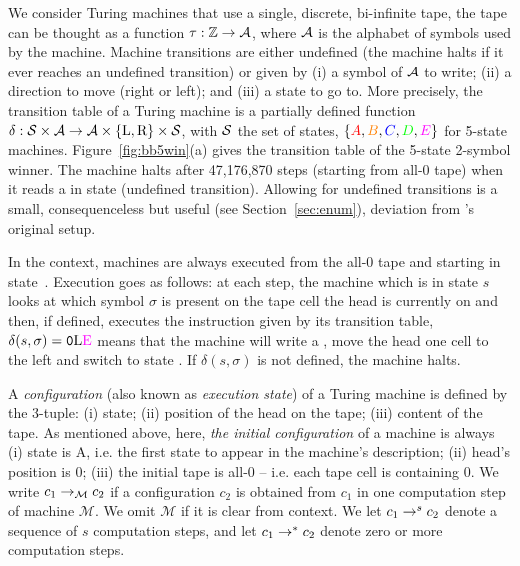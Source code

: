 We consider Turing machines that use a single, discrete, bi-infinite tape, \ie the tape can be thought as a function $\tau: \mathbb{Z} \to \mathcal{A}$, where $\mathcal{A}$ is the alphabet of symbols used by the machine. Machine transitions are either undefined (the machine halts if it ever reaches an undefined transition) or given by (i) a symbol of $\mathcal{A}$ to write; (ii) a direction to move (right or left); and (iii) a state to go to. More precisely, the transition table of a Turing machine is a partially defined function $\delta: \mathcal{S} \times \mathcal{A} \to \mathcal{A} \times \{\text{L},\text{R}\} \times \mathcal{S} $, with $\mathcal{S}$ the set of states, \eg $\{\stateA,\stateB,\stateC,\stateD,\stateE\}$ for 5-state machines. Figure~\ref{fig:bb5win}(a) gives the transition table of the 5-state 2-symbol \BBfull winner. The machine halts after 47,176,870 steps (starting from all-0 tape) when it reads a \szero in state \stateE (undefined transition). Allowing for undefined transitions is a small, consequenceless but useful (see Section~\ref{sec:enum}), deviation from \rado's original setup.

In the \BBfull context, machines are always executed from the all-0 tape and starting in state~\stateA. Execution goes as follows: at each step, the machine which is in state $s$ looks at which symbol $\sigma$ is present on the tape cell the head is currently on and then, if defined, executes the instruction given by its transition table, \eg $\delta(s, \sigma) = \szero\text{L}\text{\stateE}$ means that the machine will write a \szero, move the head one cell to the left and switch to state \stateE. If $\delta(s, \sigma)$ is not defined, the machine halts.



A \textit{configuration} (also known as \textit{execution state}) of a Turing machine is defined by the 3-tuple: (i) state; (ii) position of the head on the tape; (iii) content of the tape. As mentioned above, here, \textit{the initial configuration} of a machine is always (i) state is A, i.e. the first state to appear in the machine's description; (ii) head's position is 0; (iii) the initial tape is all-0 -- i.e. each tape cell is containing 0. We write $c_1 \to_\mathcal{M} c_2$ if a configuration $c_2$ is obtained from $c_1$ in one computation step of machine $\mathcal{M}$. We omit $\mathcal{M}$ if it is clear from context. We let $c_1 \to^s c_2$ denote a sequence of $s$ computation steps, and let $c_1 \to^* c_2$ denote zero or more computation steps. %

